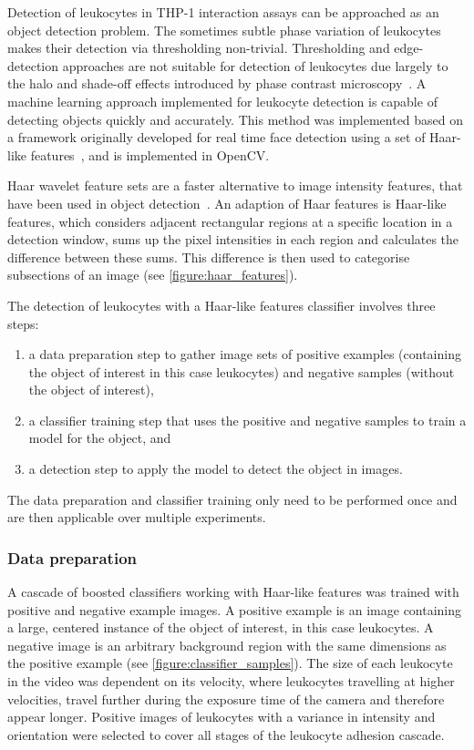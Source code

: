 Detection of leukocytes in THP-1 interaction assays can be approached as an object detection problem. The sometimes subtle phase variation of leukocytes makes their detection via thresholding non-trivial. Thresholding and edge-detection approaches are not suitable for detection of leukocytes due largely to the halo and shade-off effects introduced by phase contrast microscopy~\cite{Yin2012}. A machine learning approach implemented for leukocyte detection is capable of detecting objects quickly and accurately. This method was implemented based on a framework originally developed for real time face detection using a set of Haar-like features~\cite{Viola2001, Lienhart2002}, and is implemented in OpenCV.

Haar wavelet feature sets are a faster alternative to image intensity features, that have been used in object detection~\cite{Papageorgiou1998}. An adaption of Haar features is Haar-like features, which considers adjacent rectangular regions at a specific location in a detection window, sums up the pixel intensities in each region and calculates the difference between these sums. This difference is then used to categorise subsections of an image (see \autoref{figure:haar_features}).

The detection of leukocytes with a Haar-like features classifier involves three steps:
\begin{enumerate}
\item a data preparation step to gather image sets of positive examples (containing the object of interest in this case leukocytes) and negative samples (without the object of interest),
\item a classifier training step that uses the positive and negative samples to train a model for the object, and
\item a detection step to apply the model to detect the object in images.
\end{enumerate}
The data preparation and classifier training only need to be performed once and are then applicable over multiple experiments.

\subsubsection{Data preparation}
A cascade of boosted classifiers working with Haar-like features was trained with positive and negative example images. A positive example is an image containing a large, centered instance of the object of interest, in this case leukocytes. A negative image is an arbitrary background region with the same dimensions as the positive example (see \autoref{figure:classifier_samples}). The size of each leukocyte in the video was dependent on its velocity, where leukocytes travelling at higher velocities, travel further during the exposure time of the camera and therefore appear longer. Positive images of leukocytes with a variance in intensity and orientation were selected to cover all stages of the leukocyte adhesion cascade.

